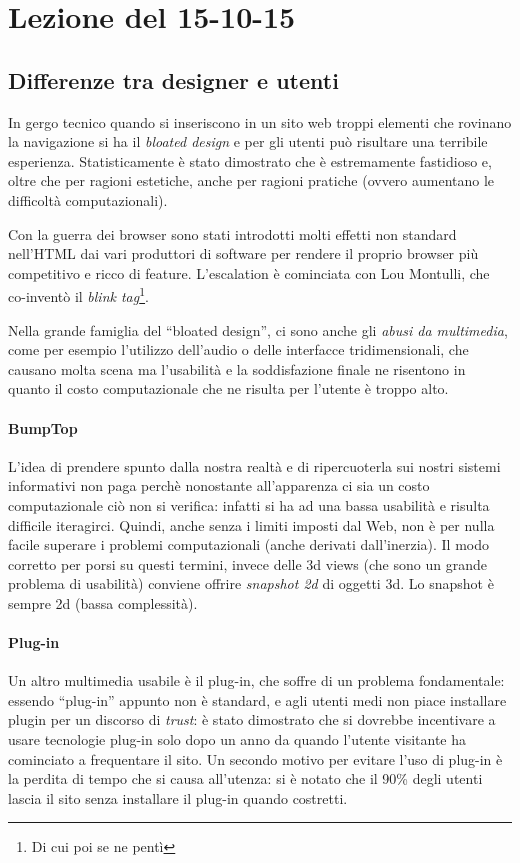 \section{Lezione del 15-10-15}

\subsection{Differenze tra designer e utenti}

In gergo tecnico quando si inseriscono in un sito web troppi elementi che rovinano la navigazione si ha il \textit{bloated design} e per gli utenti pu\`o risultare una terribile esperienza. Statisticamente \`e stato dimostrato che \`e estremamente fastidioso e, oltre che per ragioni estetiche, anche per ragioni pratiche (ovvero aumentano le difficolt\`a computazionali).

Con la guerra dei browser sono stati introdotti molti effetti non standard nell'HTML dai vari produttori di software per rendere il proprio browser pi\`u competitivo e ricco di feature. L'escalation \`e cominciata con Lou Montulli, che co-invent\`o il \textit{blink tag}\footnote{Di cui poi se ne pent\`i}.

Nella grande famiglia del ``bloated design'', ci sono anche gli \textit{abusi da multimedia}, come per esempio l'utilizzo dell'audio o delle interfacce tridimensionali, che causano molta scena ma l'usabilit\`a e la soddisfazione finale ne risentono in quanto il costo computazionale che ne risulta per l'utente \`e troppo alto.

\paragraph*{BumpTop} L'idea di prendere spunto dalla nostra realt\`a e di ripercuoterla sui nostri sistemi informativi non paga perch\`e nonostante all'apparenza ci sia un costo computazionale ci\`o non si verifica: infatti si ha ad una bassa usabilit\`a e risulta difficile iteragirci. Quindi, anche senza i limiti imposti dal Web, non \`e per nulla facile superare i problemi computazionali (anche derivati dall'inerzia). Il modo corretto per porsi su questi termini, invece delle 3d views (che sono un grande problema di usabilit\`a) conviene offrire \textit{snapshot 2d} di oggetti 3d. Lo snapshot \`e sempre 2d (bassa complessit\`a).

\paragraph*{Plug-in} Un altro multimedia usabile \`e il plug-in, che soffre di un problema fondamentale: essendo ``plug-in'' appunto non \`e standard, e agli utenti medi non piace installare plugin per un discorso di \textit{trust}: \`e stato dimostrato che si dovrebbe incentivare a usare tecnologie plug-in solo dopo un anno da quando l'utente visitante ha cominciato a frequentare il sito. Un secondo motivo per evitare l'uso di plug-in \`e la perdita di tempo che si causa all'utenza: si \`e notato che il 90\% degli utenti lascia il sito senza installare il plug-in quando costretti.

